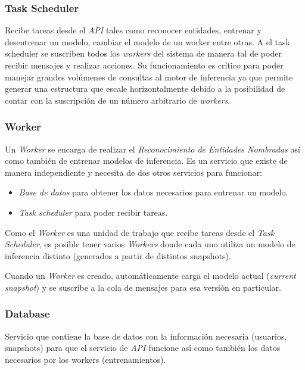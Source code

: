 \documentclass[12pt,a4paper,]{scrartcl}
\providecommand{\tightlist}{%
  \setlength{\itemsep}{0pt}\setlength{\parskip}{0pt}}
\begin{document}
\hypertarget{task-scheduler}{%
\subsubsection{Task Scheduler}\label{task-scheduler}}

Recibe tareas desde el \emph{API} tales como reconocer entidades, entrenar y desentrenar un modelo, cambiar el modelo de un worker entre otras. A el task scheduler se suscriben todos los \emph{workers} del sistema de manera tal de poder recibir mensajes y realizar acciones.
Su funcionamiento es crítico para poder manejar grandes volúmenes de consultas al motor de inferencia ya que permite generar una estructura que escale horizontalmente debido a la posibilidad de contar con la suscripción de un número arbitrario de \emph{workers}.

\hypertarget{worker}{%
\subsubsection{Worker}\label{worker}}

Un \emph{Worker} se encarga de realizar el \emph{Reconocimiento de Entidades Nombradas} así como también de entrenar modelos de inferencia. Es un servicio que existe de manera independiente y necesita de dos otros servicios para funcionar:

\begin{itemize}
\tightlist
\item
  \emph{Base de datos} para obtener los datos necesarios para entrenar un modelo.
\item
  \emph{Task scheduler} para poder recibir tareas.
\end{itemize}

Como el \emph{Worker} es una unidad de trabajo que recibe tareas desde el \emph{Task Scheduler}, es posible tener varios \emph{Workers} donde cada uno utiliza un modelo de inferencia distinto (generados a partir de distintos snapshots).

Cuando un \emph{Worker} es creado, automáticamente carga el modelo actual (\emph{current snapshot}) y se suscribe a la cola de mensajes para esa versión en particular.

\hypertarget{database}{%
\subsubsection{Database}\label{database}}

Servicio que contiene la base de datos con la información necesaria (usuarios, snapshots) para que el servicio de \emph{API} funcione así como también los datos necesarios por los workers (entrenamientos).
\end{document}

